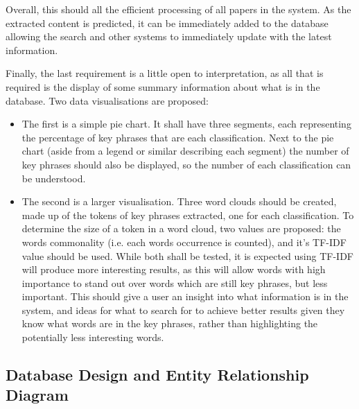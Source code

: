 Overall, this should all the efficient processing of all papers in the system. As the extracted content is predicted, it can be immediately added to the database allowing the search and other systems to immediately update with the latest information.

Finally, the last requirement is a little open to interpretation, as all that is required is the display of some summary information about what is in the database. Two data visualisations are proposed:
\begin{itemize}
	\item The first is a simple pie chart. It shall have three segments, each representing the percentage of key phrases that are each classification. Next to the pie chart (aside from a legend or similar describing each segment) the number of key phrases should also be displayed, so the number of each classification can be understood.
	\item The second is a larger visualisation. Three word clouds should be created, made up of the tokens of key phrases extracted, one for each classification. To determine the size of a token in a word cloud, two values are proposed: the words commonality (i.e. each words occurrence is counted), and it's TF-IDF value should be used. While both shall be tested, it is expected using TF-IDF will produce more interesting results, as this will allow words with high importance to stand out over words which are still key phrases, but less important. This should give a user an insight into what information is in the system, and ideas for what to search for to achieve better results given they know what words are in the key phrases, rather than highlighting the potentially less interesting words.
\end{itemize}

\subsection*{Database Design and Entity Relationship Diagram}

